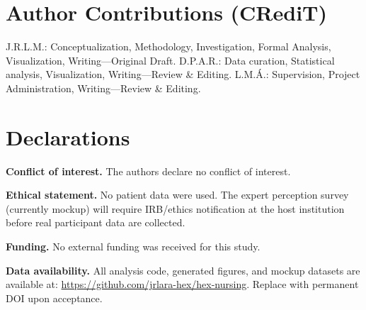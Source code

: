 \documentclass[12pt,a4paper]{article}
\begin{document}
\section*{Author Contributions (CRediT)}
\noindent J.R.L.M.: Conceptualization, Methodology, Investigation, Formal Analysis,
Visualization, Writing---Original Draft.
D.P.A.R.: Data curation, Statistical analysis, Visualization,
Writing---Review \& Editing.
L.M.\'A.: Supervision, Project Administration, Writing---Review \& Editing.

\section*{Declarations}

\noindent\textbf{Conflict of interest.} The authors declare no conflict of interest.

\noindent\textbf{Ethical statement.} No patient data were used.
The expert perception survey (currently mockup) will require IRB/ethics
notification at the host institution before real participant data are collected.

\noindent\textbf{Funding.} No external funding was received for this study.

\noindent\textbf{Data availability.}
All analysis code, generated figures, and mockup datasets are available at:
\url{https://github.com/jrlara-hex/hex-nursing}.
Replace with permanent DOI upon acceptance.



\end{document}
